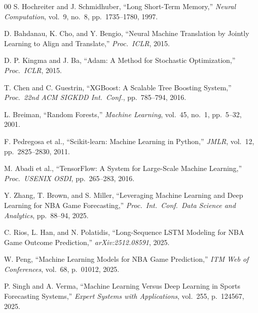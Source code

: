 \documentclass[conference]{IEEEtran}
\begin{document}
\begin{thebibliography}{00}
S. Hochreiter and J. Schmidhuber,
``Long Short-Term Memory,''
\textit{Neural Computation}, vol.~9, no.~8, pp.~1735--1780, 1997.

D. Bahdanau, K. Cho, and Y. Bengio,
``Neural Machine Translation by Jointly Learning to Align and Translate,''
\textit{Proc.\ ICLR}, 2015.

D. P. Kingma and J. Ba,
``Adam: A Method for Stochastic Optimization,''
\textit{Proc.\ ICLR}, 2015.

T. Chen and C. Guestrin,
``XGBoost: A Scalable Tree Boosting System,''
\textit{Proc.\ 22nd ACM SIGKDD Int.\ Conf.}, pp.~785--794, 2016.

L. Breiman,
``Random Forests,''
\textit{Machine Learning}, vol.~45, no.~1, pp.~5--32, 2001.

F. Pedregosa et al.,
``Scikit-learn: Machine Learning in Python,''
\textit{JMLR}, vol.~12, pp.~2825--2830, 2011.

M. Abadi et al.,
``TensorFlow: A System for Large-Scale Machine Learning,''
\textit{Proc.\ USENIX OSDI}, pp.~265--283, 2016.

Y. Zhang, T. Brown, and S. Miller,
``Leveraging Machine Learning and Deep Learning for NBA Game Forecasting,''
\textit{Proc.\ Int.\ Conf.\ Data Science and Analytics}, pp.~88--94, 2025.

C. Rios, L. Han, and N. Polatidis,
``Long-Sequence LSTM Modeling for NBA Game Outcome Prediction,''
\textit{arXiv:2512.08591}, 2025.

W. Peng,
``Machine Learning Models for NBA Game Prediction,''
\textit{ITM Web of Conferences}, vol.~68, p.~01012, 2025.

P. Singh and A. Verma,
``Machine Learning Versus Deep Learning in Sports Forecasting Systems,''
\textit{Expert Systems with Applications}, vol.~255, p.~124567, 2025.

\end{thebibliography}
\end{document}
